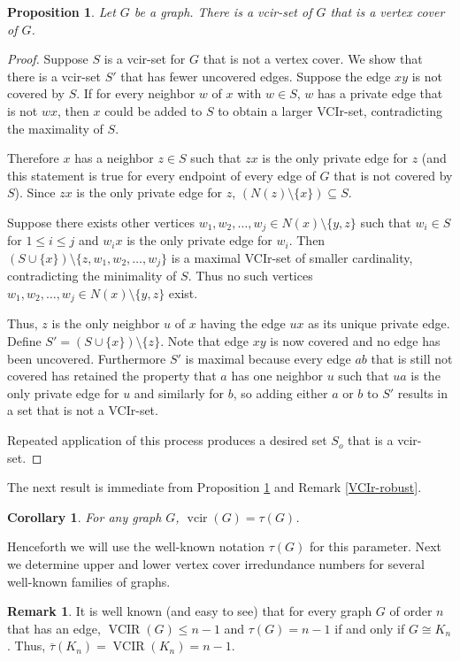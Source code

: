 \documentclass{article}
\numberwithin{figure}{section}
\numberwithin{table}{section}
\numberwithin{equation}{section}
\newtheorem{cor}[thm]{Corollary}
\newtheorem{prop}[thm]{Proposition}
\theoremstyle{definition}
\newtheorem{rem}[thm]{Remark}
\theoremstyle{definition}
\theoremstyle{definition}
\newcommand{\bpf}{\begin{proof}}
\newcommand{\epf}{\end{proof}\ms}
\newcommand{\ms}{\medskip}
\newcommand{\ol}{\overline}
\newcommand{\vc}{\tau}
\newcommand{\vcbar}{\ol\vc}
\DeclareMathOperator{\VCIR}{VCIR}
\DeclareMathOperator{\vcir}{vcir}
\begin{document}
\begin{prop}\label{vcirtocover} Let $G$ be a graph.  
There is a vcir-set of $G$ that is a  vertex cover of $G$.   \end{prop}
\bpf 
 Suppose $S$ is a vcir-set for $G$ that is not a vertex cover.  We show that there is a  vcir-set $S'$ that has fewer uncovered edges. 
Suppose the edge $xy$ is not covered by $S$.  If for every neighbor $w$ of $x$ with $w \in S$, $w$ has a private edge that is not $wx$, then $x$ could be added to $S$ to obtain a larger VCIr-set, contradicting the maximality of $S$.  

Therefore $x$ has a neighbor $z \in S$ such that $zx$ is the only private edge for $z$ (and this statement is true for every endpoint of every edge of $G$ that is not covered by $S$).  Since $zx$ is the only private edge for $z$, $(N(z)\setminus\{x\})\subseteq S$. 

Suppose there exists other vertices $w_1, w_2, \dots, w_j \in N(x)\setminus\{y, z\}$ such that $w_i \in S$ for $1 \leq i \leq j$ and $w_ix$ is the only private edge for $w_i$. Then $(S\cup\{x\})\setminus\{z, w_1, w_2, \dots, w_j\}$  
is a maximal VCIr-set of smaller cardinality, contradicting the minimality of $S$. Thus no such vertices $w_1, w_2, \dots, w_j \in N(x)\setminus\{y, z\}$ exist. 

Thus, $z$ is the only neighbor $u$ of $x$ having the edge $ux$ as its unique private edge.  Define $S'=(S\cup\{x\})\setminus\{z\}$.  Note that edge $xy$ is now covered and no edge has been uncovered.  Furthermore $S'$ is maximal because every  edge $ab$ that is still not covered has retained the property that $a$ has one neighbor $u$ such that $ua$ is the only private edge for $u$ and similarly for $b$, so adding either $a$ or $b$ to $S'$ results in a set that is not a VCIr-set.

Repeated application of this process produces a desired set $S_o$ that is  a vcir-set. 
\epf

The next result is immediate from  Proposition \ref{vcirtocover}  and  Remark \ref{VCIr-robust}.
\begin{cor}\label{c:vcir=tau}
    For any graph $G$, $\vcir(G)=\vc(G)$.
\end{cor}

 Henceforth we will use the well-known notation $\vc(G)$  for this parameter.
 Next we determine upper and lower vertex cover irredundance numbers for several well-known families of graphs.

\begin{rem}\label{rem:vcirKn}
   It is well known  (and easy to see) that for every graph $G$  of order $n$ that has an edge, $\VCIR(G)\le n-1$ and $\tau(G)=n-1$ if and only if $G\cong K_n$. Thus, $\vcbar(K_n)=\VCIR(K_n)=n-1$.  
\end{rem}
\end{document}
